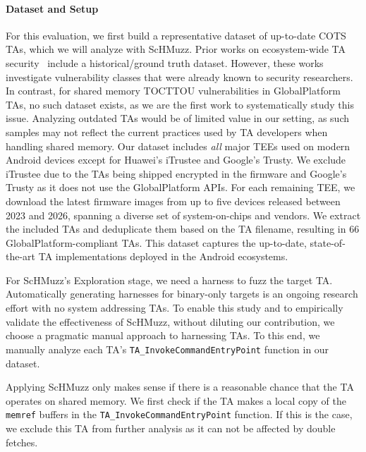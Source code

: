 \documentclass[conference]{IEEEtran}
\newcommand{\sysname}{ScHMuzz\xspace}
\newcommand{\stageone}{Exploration\xspace}
\newcommand{\numTAs}{66\xspace}
\begin{document}
\paragraph{Dataset and Setup}


%                                                                                      

For this evaluation, we first build a representative dataset of up-to-date COTS TAs, which we will analyze with \sysname. 
Prior works on ecosystem-wide TA security~\cite{rollback,globalconfusion} include a historical/ground 
truth dataset. However, these works investigate vulnerability classes that were already known to security researchers. 
In contrast, for shared memory TOCTTOU vulnerabilities in GlobalPlatform TAs, no such dataset exists, as we are the 
first work to systematically study this issue. Analyzing outdated TAs would be of 
limited value in our setting, as such samples may not reflect the current practices used by 
TA developers when handling shared memory.
Our dataset includes \emph{all} major TEEs used on modern Android devices except for Huawei's iTrustee and 
Google's Trusty. We exclude iTrustee due to the TAs being shipped encrypted in the firmware and Google's 
Trusty as it does not use the GlobalPlatform APIs. For each remaining TEE, we download the latest firmware 
images from up to five devices released between 2023 and 2026, spanning a diverse set of system-on-chips and 
vendors. We extract the included TAs and deduplicate them based on the TA filename, resulting in \numTAs 
GlobalPlatform-compliant TAs. This dataset captures the up-to-date, state-of-the-art TA implementations 
deployed in the Android ecosystems. 

For \sysname's \stageone stage, we need a harness to fuzz the target TA. 
Automatically generating harnesses for binary-only targets is an ongoing research effort with no 
system addressing TAs. To enable this study and to empirically validate the effectiveness of 
\sysname, without diluting our contribution, we choose a pragmatic manual approach to harnessing TAs.
To this end, we manually analyze each TA's \texttt{TA\_InvokeCommandEntryPoint} function in our dataset.

Applying \sysname only makes sense if there is a reasonable chance that the TA operates on shared memory.
We first check if the TA makes a local copy of the \texttt{memref} buffers in the \texttt{TA\_InvokeCommandEntryPoint} 
function. If this is the case, we 
exclude this TA from further analysis as it can not be affected by double fetches. 
\end{document}
